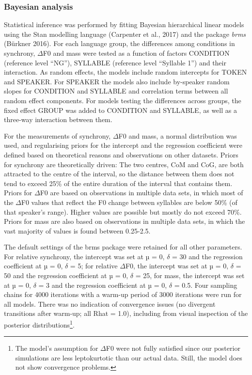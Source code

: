 \subsubsection{Bayesian analysis}
\hypertarget{Toc191305895}{}\begin{styleStandard}
Statistical inference was performed by fitting Bayesian hierarchical linear models using the Stan modelling language (Carpenter et al., 2017) and the package \textit{brms} (Bürkner 2016). For each language group, the differences among conditions in synchrony, ${\Delta}$F0 and mass were tested as a function of factors CONDITION (reference level “NG”), SYLLABLE (reference level “Syllable 1”) and their interaction. As random effects, the models include random intercepts for TOKEN and SPEAKER. For SPEAKER the models also include by-speaker random slopes for CONDITION and SYLLABLE and correlation terms between all random effect components. For models testing the differences across groups, the fixed effect GROUP was added to CONDITION and SYLLABLE, as well as a three-way interaction between them.
\end{styleStandard}

\begin{styleStandard}
For the measurements of synchrony, ${\Delta}$F0 and mass, a normal distribution was used, and regularising priors for the intercept and the regression coefficient were defined based on theoretical reasons and observations on other datasets. Priors for synchrony are theoretically driven: The two centres, CoM and CoG, are both attracted to the centre of the interval, so the distance between them does not tend to exceed 25\% of the entire duration of the interval that contains them. Priors for ${\Delta}$F0 are based on observations in multiple data sets, in which most of the ${\Delta}$F0 values that reflect the F0 change between syllables are below 50\% (of that speaker’s range). Higher values are possible but mostly do not exceed 70\%. Priors for mass are also based on observations in multiple data sets, in which the vast majority of values is found between 0.25-2.5.
\end{styleStandard}

\begin{styleStandard}
The default settings of the brms package were retained for all other parameters. For relative synchrony, the intercept was set at µ = 0, $\delta $ = 30 and the regression coefficient at µ = 0, $\delta $ = 5; for relative ${\Delta}$F0, the intercept was set at µ = 0, $\delta $ = 50 and the regression coefficient at µ = 0, $\delta $ = 25, for mass, the intercept was set at µ = 0, $\delta $ = 3 and the regression coefficient at µ = 0, $\delta $ = 0.5. Four sampling chains for 4000 iterations with a warm-up period of 3000 iterations were run for all models. There was no indication of convergence issues (no divergent transitions after warm-up; all Rhat = 1.0), including from visual inspection of the posterior distributions\footnote{The model’s assumption for \textrm{${\Delta}$}F0 were not fully satisfied since our posterior simulations are less leptokurtotic than our actual data. Still, the model does not show convergence problems.\par }.
\end{styleStandard}

